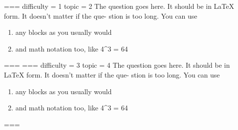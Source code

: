 ===
difficulty = 1
topic = 2
The question goes here. It should be in LaTeX form. It doesn't matter if the que-
stion is too long. You can use
\begin{enumerate}
    \item any blocks as you usually would
    \item and math notation too, like 4^3 = 64
\end{enumerate}
===
===
difficulty = 3
topic = 4
The question goes here. It should be in LaTeX form. It doesn't matter if the que-
stion is too long. You can use
\begin{enumerate}
    \item any blocks as you usually would
    \item and math notation too, like 4^3 = 64
\end{enumerate}
===
